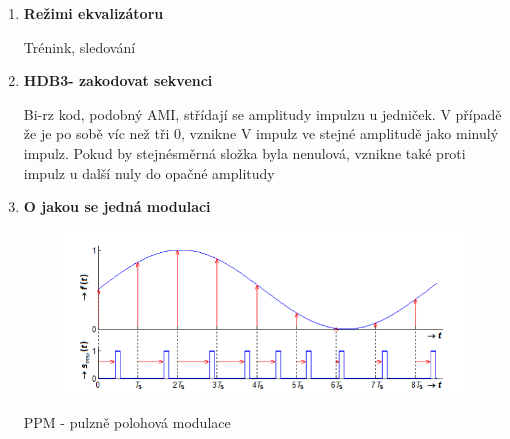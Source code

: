 \begin{enumerate}
    \item \textbf{Režimi ekvalizátoru}

      Trénink, sledování
    \item \textbf{HDB3- zakodovat sekvenci}

    Bi-rz kod, podobný  AMI, střídají se amplitudy impulzu u jedniček. V případě že je po sobě víc než tři 0, vznikne V impulz ve stejné amplitudě jako minulý impulz. Pokud by stejnésměrná složka byla nenulová, vznikne také proti impulz u další nuly do opačné amplitudy

    \item  \textbf{O jakou se jedná modulaci}
    \begin{figure}[h!]
        \centering
        \includegraphics{images/PPM.png}
        \label{fig:enter-label}
    \end{figure}
\clearpage
    PPM - pulzně polohová modulace
\end{enumerate}